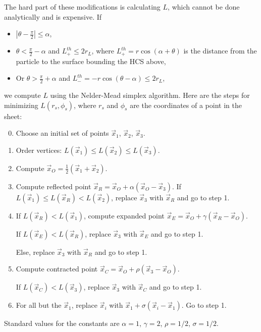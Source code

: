 \documentclass[11pt]{article}
\begin{document}
The hard part of these modifications is calculating $L$, which cannot be done analytically and is expensive.  If
\begin{itemize}
    \item
        $|\theta - \frac{\pi}{2}| \leq \alpha$,
    \item
        $\theta < \frac{\pi}{2} - \alpha$ and $L_+^{th} \leq 2 r_L$, where $L_+^{th} = r \cos(\alpha + \theta)$ is the distance from the particle to the surface bounding the HCS above,
    \item
        Or $\theta > \frac{\pi}{2} + \alpha$ and $L_-^{th} = - r \cos(\theta - \alpha) \leq 2 r_L$,
\end{itemize}
we compute $L$ using the Nelder-Mead simplex algorithm.  Here are the steps for minimizing $L(r_s, \phi_s)$, where $r_s$ and $\phi_s$ are the coordinates of a point in the sheet:
\begin{enumerate}
    \setcounter{enumi}{-1}
    \item
        Choose an initial set of points $\vec{x}_1$, $\vec{x}_2$, $\vec{x}_3$.
    \item
        Order vertices: $L(\vec{x}_1) \leq L(\vec{x}_2) \leq L(\vec{x}_3)$.
    \item
        Compute $\vec{x}_O = \frac{1}{2} (\vec{x}_1 + \vec{x}_2)$.
    \item
        Compute reflected point $\vec{x}_R = \vec{x}_O + \alpha (\vec{x}_O - \vec{x}_3)$.  If $L(\vec{x}_1) \leq L(\vec{x}_R) < L(\vec{x}_2)$, replace $\vec{x}_3$ with $\vec{x}_R$ and go to step 1.
    \item
        If $L(\vec{x}_R) < L(\vec{x}_1)$, compute expanded point $\vec{x}_E = \vec{x}_O + \gamma (\vec{x}_R - \vec{x}_O)$.  

        If $L(\vec{x}_E) < L(\vec{x}_R)$, replace $\vec{x}_3$ with $\vec{x}_E$ and go to step 1.

        Else, replace $\vec{x}_3$ with $\vec{x}_R$ and go to step 1.
    \item
        Compute contracted point $\vec{x}_C = \vec{x}_O + \rho (\vec{x}_3 - \vec{x}_O)$.

        If $L(\vec{x}_C) < L(\vec{x}_3)$, replace $\vec{x}_3$ with $\vec{x}_C$ and go to step 1.
    \item
        For all but the $\vec{x}_1$, replace $\vec{x}_i$ with $\vec{x}_1 + \sigma (\vec{x}_i - \vec{x}_1)$.  Go to step 1.
\end{enumerate}
Standard values for the constants are $\alpha = 1$, $\gamma = 2$, $\rho = 1/2$, $\sigma = 1/2$.  
\end{document}
